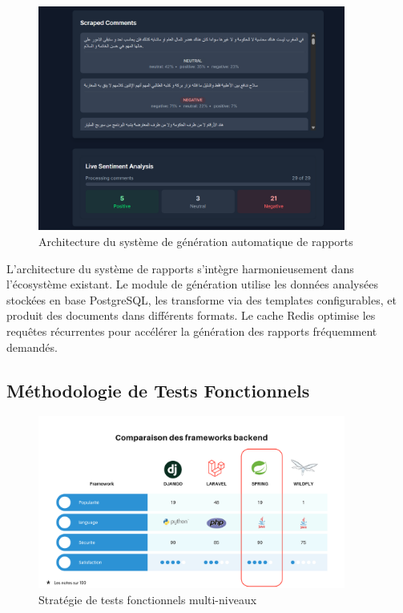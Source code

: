 \begin{figure}[H]
\centering
\includegraphics[width=0.9\textwidth]{assets/images/report-ui.png}
\caption{Architecture du système de génération automatique de rapports}
\label{fig:reports-architecture}
\end{figure}

L'architecture du système de rapports s'intègre harmonieusement dans l'écosystème existant. Le module de génération utilise les données analysées stockées en base PostgreSQL, les transforme via des templates configurables, et produit des documents dans différents formats. Le cache Redis optimise les requêtes récurrentes pour accélérer la génération des rapports fréquemment demandés.

\subsection{Méthodologie de Tests Fonctionnels}

\begin{figure}[H]
\centering
\includegraphics[width=0.9\textwidth]{assets/images/bechmark.png}
\caption{Stratégie de tests fonctionnels multi-niveaux}
\label{fig:testing-strategy}
\end{figure}

